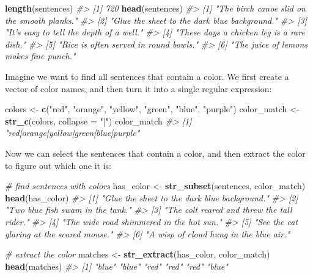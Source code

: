 \documentclass[]{book}
\newenvironment{Shaded}{\begin{snugshade}}{\end{snugshade}}
\newcommand{\CommentTok}[1]{\textcolor[rgb]{0.56,0.35,0.01}{\textit{#1}}}
\newcommand{\DataTypeTok}[1]{\textcolor[rgb]{0.13,0.29,0.53}{#1}}
\newcommand{\KeywordTok}[1]{\textcolor[rgb]{0.13,0.29,0.53}{\textbf{#1}}}
\newcommand{\NormalTok}[1]{#1}
\newcommand{\StringTok}[1]{\textcolor[rgb]{0.31,0.60,0.02}{#1}}
\begin{document}
\begin{Shaded}
\begin{Highlighting}[]
\KeywordTok{length}\NormalTok{(sentences)}
\CommentTok{#> [1] 720}
\KeywordTok{head}\NormalTok{(sentences)}
\CommentTok{#> [1] "The birch canoe slid on the smooth planks." }
\CommentTok{#> [2] "Glue the sheet to the dark blue background."}
\CommentTok{#> [3] "It's easy to tell the depth of a well."     }
\CommentTok{#> [4] "These days a chicken leg is a rare dish."   }
\CommentTok{#> [5] "Rice is often served in round bowls."       }
\CommentTok{#> [6] "The juice of lemons makes fine punch."}
\end{Highlighting}
\end{Shaded}

Imagine we want to find all sentences that contain a color. We first create a vector of color names, and then turn it into a single regular expression:

\begin{Shaded}
\begin{Highlighting}[]
\NormalTok{colors <-}\StringTok{ }\KeywordTok{c}\NormalTok{(}\StringTok{"red"}\NormalTok{, }\StringTok{"orange"}\NormalTok{, }\StringTok{"yellow"}\NormalTok{, }\StringTok{"green"}\NormalTok{, }\StringTok{"blue"}\NormalTok{, }\StringTok{"purple"}\NormalTok{)}
\NormalTok{color_match <-}\StringTok{ }\KeywordTok{str_c}\NormalTok{(colors, }\DataTypeTok{collapse =} \StringTok{"|"}\NormalTok{)}
\NormalTok{color_match}
\CommentTok{#> [1] "red|orange|yellow|green|blue|purple"}
\end{Highlighting}
\end{Shaded}

Now we can select the sentences that contain a color, and then extract the color to figure out which one it is:

\begin{Shaded}
\begin{Highlighting}[]
\CommentTok{# find sentences with colors}
\NormalTok{has_color <-}\StringTok{ }\KeywordTok{str_subset}\NormalTok{(sentences, color_match)}
\KeywordTok{head}\NormalTok{(has_color)}
\CommentTok{#> [1] "Glue the sheet to the dark blue background."}
\CommentTok{#> [2] "Two blue fish swam in the tank."            }
\CommentTok{#> [3] "The colt reared and threw the tall rider."  }
\CommentTok{#> [4] "The wide road shimmered in the hot sun."    }
\CommentTok{#> [5] "See the cat glaring at the scared mouse."   }
\CommentTok{#> [6] "A wisp of cloud hung in the blue air."}

\CommentTok{# extract the color}
\NormalTok{matches <-}\StringTok{ }\KeywordTok{str_extract}\NormalTok{(has_color, color_match)}
\KeywordTok{head}\NormalTok{(matches)}
\CommentTok{#> [1] "blue" "blue" "red"  "red"  "red"  "blue"}
\end{Highlighting}
\end{Shaded}
\end{document}
